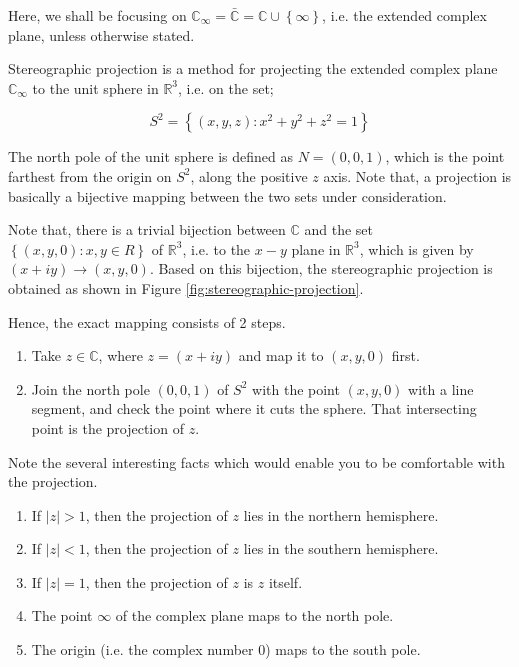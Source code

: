 \documentclass[12pt]{article}
\newcommand{\R}{\mathbb{R}}
\newcommand{\C}{\mathbb{C}}
\theoremstyle{definition}
\newenvironment{note}{
\begin{tcolorbox}[colback=blue!5!white,colframe=blue!75!black,title=Note, parbox = false] }{\end{tcolorbox} }
\begin{document}
Here, we shall be focusing on $\C_{\infty} = \bar{\C} = \C \cup \left\{\infty\right\}$, i.e. the extended complex plane, unless otherwise stated. 

Stereographic projection is a method for projecting the extended complex plane $\C_{\infty}$ to the unit sphere in $\R^3$, i.e. on the set;

$$S^2 = \left\{ (x, y, z) : x^2 + y^2 + z^2 = 1  \right\}$$

The north pole of the unit sphere is defined as $N = (0, 0, 1)$, which is the point farthest from the origin on $S^2$, along the positive $z$ axis. Note that, a projection is basically a bijective mapping between the two sets under consideration. 

Note that, there is a trivial bijection between $\C$ and the set $\left\{ (x, y, 0) : x, y \in R \right\}$ of $\R^3$, i.e. to the $x-y$ plane in $\R^3$, which is given by $(x + iy) \rightarrow (x, y, 0)$. Based on this bijection, the stereographic projection is obtained as shown in Figure \ref{fig:stereographic-projection}.

Hence, the exact mapping consists of 2 steps.
\begin{enumerate}
    \item Take $z \in \C$, where $z = (x + iy)$ and map it to $(x, y, 0)$ first.
    \item Join the north pole $(0, 0, 1)$ of $S^2$ with the point $(x, y, 0)$ with a line segment, and check the point where it cuts the sphere. That intersecting point is the projection of $z$.
\end{enumerate}


\begin{note}
    Note the several interesting facts which would enable you to be comfortable with the projection.
    
    \begin{enumerate}
        \item If $\vert z \vert > 1$, then the projection of $z$ lies in the northern hemisphere.
        \item If $\vert z \vert < 1$, then the projection of $z$ lies in the southern hemisphere.
        \item If $\vert z \vert = 1$, then the projection of $z$ is $z$ itself.
        \item The point $\infty$ of the complex plane maps to the north pole.
        \item The origin (i.e. the complex number $0$) maps to the south pole.
    \end{enumerate}    
\end{note}
\end{document}
